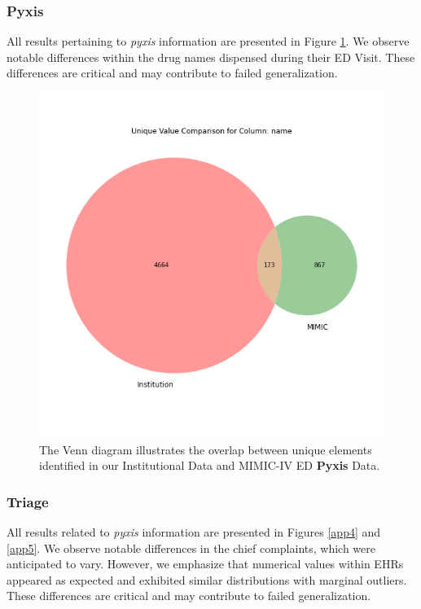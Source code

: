 \documentclass[pmlr]{jmlr}%
\begin{document}
 \subsubsection*{Pyxis}
 All results pertaining to \textit{pyxis} information are presented in Figure \ref{app3}. We observe notable differences within the drug names dispensed during their ED Visit. These differences are critical and may contribute to failed generalization.
 \begin{figure}[h!]
   \centering 
   \includegraphics[width=5in]{plots/name_venn.png} 
   \caption{The Venn diagram illustrates the overlap between unique elements identified in our Institutional Data and MIMIC-IV ED \textbf{Pyxis} Data.}
   \label{app3} 
 \end{figure} 

 \subsubsection*{Triage}
All results related to \textit{pyxis} information are presented in Figures \ref{app4} and \ref{app5}. We observe notable differences in the chief complaints, which were anticipated to vary. However, we emphasize that numerical values within EHRs appeared as expected and exhibited similar distributions with marginal outliers. These differences are critical and may contribute to failed generalization.
\end{document}

